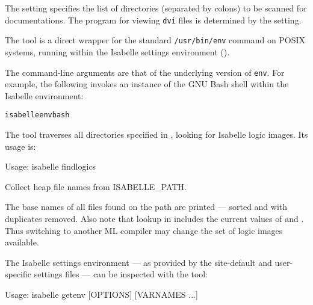 \begin{isabellebody}
\begin{isamarkuptext}
  \medskip The \hyperlink{setting.ISABELLE-DOCS}{\mbox{}} setting specifies the list of
  directories (separated by colons) to be scanned for documentations.
  The program for viewing \verb|dvi| files is determined by the
  \hyperlink{setting.DVI-VIEWER}{\mbox{}} setting.%
\end{isamarkuptext}%
\isamarkuptrue%
%
\isamarkuptrue%
%
\begin{isamarkuptext}%
The \hypertarget{tool.env}{\hyperlink{tool.env}{\mbox{}}} tool is a direct wrapper for the standard
  \verb|/usr/bin/env| command on POSIX systems, running within
  the Isabelle settings environment ().

  The command-line arguments are that of the underlying version of
  \verb|env|.  For example, the following invokes an instance of
  the GNU Bash shell within the Isabelle environment:
\begin{alltt}
  isabelle env bash
\end{alltt}%
\end{isamarkuptext}%
\isamarkuptrue%
%
\isamarkuptrue%
%
\begin{isamarkuptext}%
The \hypertarget{tool.findlogics}{\hyperlink{tool.findlogics}{\mbox{}}} tool traverses all directories
  specified in \hyperlink{setting.ISABELLE-PATH}{\mbox{}}, looking for Isabelle logic
  images. Its usage is:
\begin{ttbox}
Usage: isabelle findlogics

  Collect heap file names from ISABELLE_PATH.
\end{ttbox}

  The base names of all files found on the path are printed --- sorted
  and with duplicates removed. Also note that lookup in \hyperlink{setting.ISABELLE-PATH}{\mbox{}} includes the current values of \hyperlink{setting.ML-SYSTEM}{\mbox{}}
  and \hyperlink{setting.ML-PLATFORM}{\mbox{}}. Thus switching to another ML compiler
  may change the set of logic images available.%
\end{isamarkuptext}%
\isamarkuptrue%
%
\isamarkuptrue%
%
\begin{isamarkuptext}%
The Isabelle settings environment --- as provided by the
  site-default and user-specific settings files --- can be inspected
  with the \hypertarget{tool.getenv}{\hyperlink{tool.getenv}{\mbox{}}} tool:
\begin{ttbox}
Usage: isabelle getenv [OPTIONS] [VARNAMES ...]


\end{ttbox}
\end{isamarkuptext}
\end{isabellebody}

